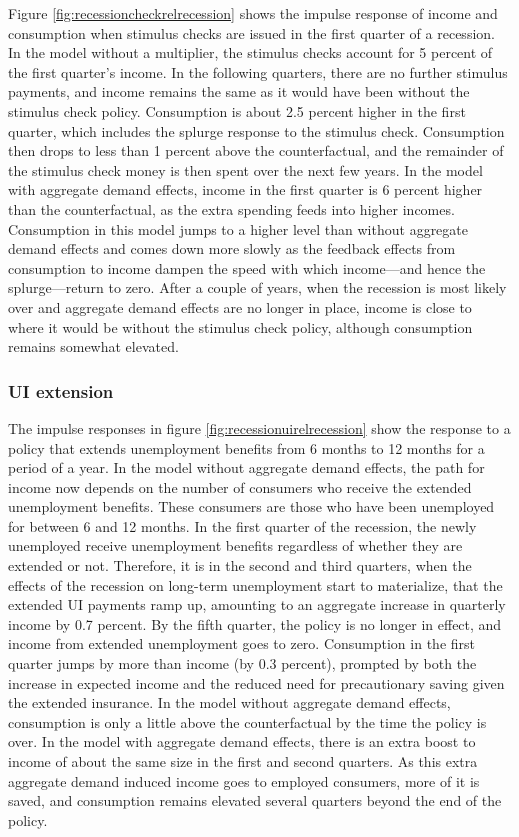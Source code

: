 \documentclass[\econtexRoot/HAFiscal]{subfiles}
\begin{document}
Figure \ref{fig:recessioncheckrelrecession} shows the impulse response of income and consumption when stimulus checks are issued in the first quarter of a recession.
In the model without a multiplier, the stimulus checks account for 5 percent of the first quarter's income.
In the following quarters, there are no further stimulus payments, and income remains the same as it would have been without the stimulus check policy.
Consumption is about 2.5 percent higher in the first quarter, which includes the splurge response to the stimulus check.
Consumption then drops to less than 1 percent above the counterfactual, and the remainder of the stimulus check money is then spent over the next few years.
In the model with aggregate demand effects, income in the first quarter is 6 percent higher than the counterfactual, as the extra spending feeds into higher incomes.
Consumption in this model jumps to a higher level than without aggregate demand effects and comes down more slowly as the feedback effects from consumption to income dampen the speed with which income---and hence the splurge---return to zero.
After a couple of years, when the recession is most likely over and aggregate demand effects are no longer in place, income is close to where it would be without the stimulus check policy, although consumption remains somewhat elevated.

\subsubsection{UI extension}


The impulse responses in figure \ref{fig:recessionuirelrecession} show the response to a policy that extends unemployment benefits from 6 months to 12 months for a period of a year.
In the model without aggregate demand effects, the path for income now depends on the number of consumers who receive the extended unemployment benefits.
These consumers are those who have been unemployed for between 6 and 12 months.
In the first quarter of the recession, the newly unemployed receive unemployment benefits regardless of whether they are extended or not.
Therefore, it is in the second and third quarters, when the effects of the recession on long-term unemployment start to materialize, that the extended UI payments ramp up, amounting to an aggregate increase in quarterly income by 0.7 percent.
By the fifth quarter, the policy is no longer in effect, and income from extended unemployment goes to zero.
Consumption in the first quarter jumps by more than income (by 0.3 percent), prompted by both the increase in expected income and the reduced need for precautionary saving given the extended insurance.
In the model without aggregate demand effects, consumption is only a little above the counterfactual by the time the policy is over.
In the model with aggregate demand effects, there is an extra boost to income of about the same size in the first and second quarters.
As this extra aggregate demand induced income goes to employed consumers, more of it is saved, and consumption remains elevated several quarters beyond the end of the policy.
\end{document}
